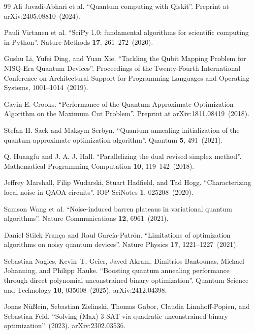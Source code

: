 \begin{thebibliography}{99}
Ali Javadi-Abhari et al.
\newblock ``Quantum computing with Qiskit''.
\newblock Preprint at arXiv:2405.08810~(2024).


Pauli Virtanen et al.
\newblock ``SciPy 1.0: fundamental algorithms for scientific computing in Python''.
\newblock Nature Methods {\bf 17}, 261--272~(2020).


Gushu Li, Yufei Ding, and Yuan Xie.
\newblock ``Tackling the Qubit Mapping Problem for NISQ-Era Quantum Devices''.
\newblock Proceedings of the Twenty-Fourth International Conference on Architectural Support for Programming Languages and Operating Systems, 1001--1014~(2019).


Gavin E. Crooks.
\newblock ``Performance of the Quantum Approximate Optimization Algorithm on the Maximum Cut Problem''.
\newblock Preprint at arXiv:1811.08419~(2018).


Stefan H. Sack and Maksym Serbyn.
\newblock ``Quantum annealing initialization of the quantum approximate optimization algorithm''.
\newblock Quantum {\bf 5}, 491~(2021).


Q. Huangfu and J. A. J. Hall.
\newblock ``Parallelizing the dual revised simplex method''.
\newblock Mathematical Programming Computation {\bf 10}, 119--142~(2018).


Jeffrey Marshall, Filip Wudarski, Stuart Hadfield, and Tad Hogg.
\newblock ``Characterizing local noise in QAOA circuits''.
\newblock IOP SciNotes {\bf 1}, 025208~(2020).


Samson Wang et al.
\newblock ``Noise-induced barren plateaus in variational quantum algorithms''.
\newblock Nature Communications {\bf 12}, 6961~(2021).


Daniel Stilck França and Raul García-Patrón.
\newblock ``Limitations of optimization algorithms on noisy quantum devices''.
\newblock Nature Physics {\bf 17}, 1221--1227~(2021).


Sebastian Nagies, Kevin~T. Geier, Javed Akram, Dimitrios Bantounas, Michael Johanning, and Philipp Hauke.
\newblock ``Boosting quantum annealing performance through direct polynomial unconstrained binary optimization''.
\newblock Quantum Science and Technology {\bf 10}, 035008~(2025).
\newblock arXiv:2412.04398.

Jonas N{\"u}{\ss}lein, Sebastian Zielinski, Thomas Gabor, Claudia Linnhoff-Popien, and Sebastian Feld.
\newblock ``Solving (Max) 3-SAT via quadratic unconstrained binary optimization''~(2023).
\newblock arXiv:2302.03536.


\end{thebibliography}

